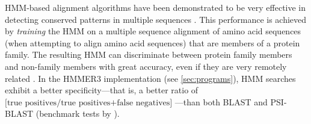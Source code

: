 
HMM-based alignment algorithms have been demonstrated to be very effective in
detecting conserved patterns in multiple sequences \citep{eddy1995, hughey1996}.
This performance is achieved by \emph{training} the HMM on a multiple sequence
alignment of amino acid sequences (when attempting to align amino acid
sequences) that are members of a protein family. The resulting HMM can
discriminate between protein family members and non-family members with great
accuracy, even if they are very remotely related \citep{karplus1998}. In the
HMMER3 implementation (see \autoref{sec:programs}), HMM searches exhibit a
better specificity---that is, a better ratio of $\textrm{[true positives/true
positives+false negatives]}$ \citep{korf2004}---than both BLAST
\citep{altschul1990} and PSI-BLAST \citep{altschul1997} (benchmark tests by
\citet{eddy2009}).

